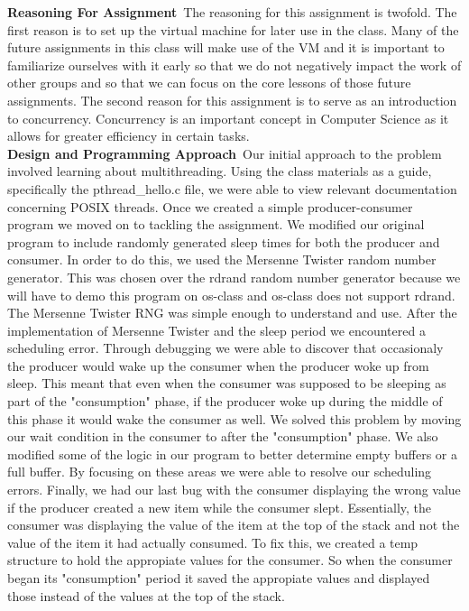 \documentclass[letterpaper,10pt,draftclsnofoot,titlepage,onecolumn]{IEEEtran}
\begin{document}
	\textbf{Reasoning For Assignment}\
		The reasoning for this assignment is twofold. The first reason is to set up the virtual machine for later use in the class. Many of the future assignments in this class will make use of the VM and it is important to familiarize ourselves with it early so that we do not negatively impact the work of other groups and so that we can focus on the core lessons of those future assignments. The second reason for this assignment is to serve as an introduction to concurrency. Concurrency is an important concept in Computer Science as it allows for greater efficiency in certain tasks.\\
		
	\textbf{Design and Programming Approach}\
		Our initial approach to the problem involved learning about multithreading. Using the class materials as a guide, specifically the pthread\_hello.c file,
		we were able to view relevant documentation concerning POSIX threads. Once we created a simple producer-consumer program we moved on to tackling the assignment.
		We modified our original program to include randomly generated sleep times for both the producer and consumer. In order to do this, we used the Mersenne Twister
		random number generator. This was chosen over the rdrand random number generator because we will have to demo this program on os-class and os-class does not support
		rdrand. The Mersenne Twister RNG was simple enough to understand and use. After the implementation of Mersenne Twister and the sleep period we encountered a scheduling
		error. Through debugging we were able to discover that occasionaly the producer would wake up the consumer when the producer woke up from sleep. This meant that even when the
		consumer was supposed to be sleeping as part of the "consumption" phase, if the producer woke up during the middle of this phase it would wake the consumer as well. We solved
		this problem by moving our wait condition in the consumer to after the "consumption" phase. We also modified some of the logic in our program to better determine empty buffers
		or a full buffer. By focusing on these areas we were able to resolve our scheduling errors. Finally, we had our last bug with the consumer displaying the wrong
		value if the producer created a new item while the consumer slept. Essentially, the consumer was displaying the value of the item at the top of the stack
		and not the value of the item it had actually consumed. To fix this, we created a temp structure to hold the appropiate values for the consumer. So when
		the consumer began its "consumption" period it saved the appropiate values and displayed those instead of the values at the top of the stack. \\
\end{document}
